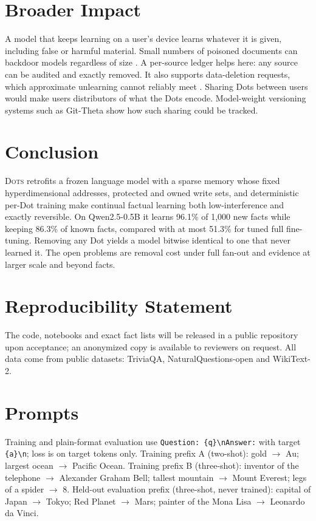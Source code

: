\documentclass[10pt]{article}
\newcommand{\sys}{\textsc{Dots}}
\begin{document}
\section{Broader Impact}

A model that keeps learning on a user's device learns whatever it is given, including false or harmful material. Small numbers of poisoned documents can backdoor models regardless of size \citep{souly2025poisoning}. A per-source ledger helps here: any source can be audited and exactly removed. It also supports data-deletion requests, which approximate unlearning cannot reliably meet \citep{zhang2025quant}. Sharing Dots between users would make users distributors of what the Dots encode. Model-weight versioning systems such as Git-Theta \citep{kandpal2023gittheta} show how such sharing could be tracked.

\section{Conclusion}

\sys{} retrofits a frozen language model with a sparse memory whose fixed hyperdimensional addresses, protected and owned write sets, and deterministic per-Dot training make continual factual learning both low-interference and exactly reversible. On Qwen2.5-0.5B it learns 96.1\% of 1{,}000 new facts while keeping 86.3\% of known facts, compared with at most 51.3\% for tuned full fine-tuning. Removing any Dot yields a model bitwise identical to one that never learned it. The open problems are removal cost under full fan-out and evidence at larger scale and beyond facts.

\section*{Reproducibility Statement}
The code, notebooks and exact fact lists will be released in a public repository upon acceptance; an anonymized copy is available to reviewers on request. All data come from public datasets: TriviaQA, NaturalQuestions-open and WikiText-2.




\appendix
\section{Prompts}
\label{app:prompts}
Training and plain-format evaluation use \texttt{Question: \{q\}\textbackslash nAnswer:} with target \texttt{ \{a\}\textbackslash n}; loss is on target tokens only.
Training prefix A (two-shot): gold $\rightarrow$ Au; largest ocean $\rightarrow$ Pacific Ocean.
Training prefix B (three-shot): inventor of the telephone $\rightarrow$ Alexander Graham Bell; tallest mountain $\rightarrow$ Mount Everest; legs of a spider $\rightarrow$ 8.
Held-out evaluation prefix (three-shot, never trained): capital of Japan $\rightarrow$ Tokyo; Red Planet $\rightarrow$ Mars; painter of the Mona Lisa $\rightarrow$ Leonardo da Vinci.
\end{document}
